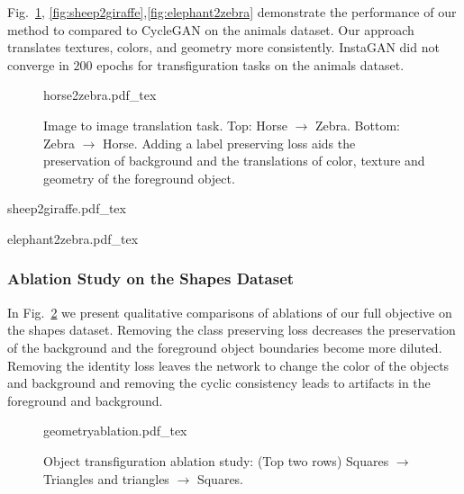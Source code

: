 Fig.~\ref{fig:horse2zebra}, \ref{fig:sheep2giraffe},\ref{fig:elephant2zebra} demonstrate the performance of our method to compared to CycleGAN on the animals dataset. Our approach translates textures, colors, and geometry more consistently. InstaGAN did not converge in $200$ epochs for transfiguration tasks on the animals dataset.

\begin{figure}[!hbpt]
    \centering
    \def\svgwidth{\columnwidth}
    {horse2zebra.pdf_tex}
    \caption[Qualitative comparison of CycleGAN and our method on Horse $\leftrightarrow$Zebra]{Image to image translation task. Top: Horse $\to$ Zebra. Bottom: Zebra $\to$ Horse. Adding a label preserving loss aids the preservation of background and the translations of color, texture and geometry of the foreground object.}
    \label{fig:horse2zebra}
\end{figure}


\begin{figure*}[!hbpt]
    \centering
    \def\svgwidth{\textwidth}
        {sheep2giraffe.pdf_tex}
    \caption[Results on Sheep$\leftrightarrow$Giraffe.]{Results on Sheep$\leftrightarrow$Giraffe. Top: Sheep $\to$ Giraffe. Bottom: Giraffe $\to$ Sheep.}
    \label{fig:sheep2giraffe}
\end{figure*}


\begin{figure*}[!hbpt]
    \centering
    \def\svgwidth{\textwidth}
        {elephant2zebra.pdf_tex}
    \caption[Results on Elephant$\leftrightarrow$Zebra]{Results on Elephant$\leftrightarrow$Zebra}
    \label{fig:elephant2zebra}
\end{figure*}

\subsubsection{Ablation Study on the Shapes Dataset}
In Fig.~\ref{fig:geomablation} we present qualitative comparisons of ablations of our full objective on the shapes dataset. Removing the class preserving loss decreases the preservation of the background and the foreground object boundaries become more diluted. Removing the identity loss leaves the network to change the color of the objects and background and removing the cyclic consistency leads to artifacts in the foreground and background.

\begin{figure}[!hbpt]
    \centering
    \def\svgwidth{\columnwidth}
   {geometryablation.pdf_tex}
    \caption[Object transfiguration ablation study on the shapes dataset.]{Object transfiguration ablation study: (Top two rows) Squares $\to$ Triangles and triangles $\to$ Squares.}
    \label{fig:geomablation}
\end{figure}

